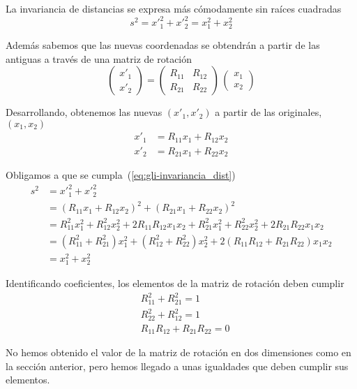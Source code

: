 La invariancia de distancias se expresa más cómodamente sin raíces cuadradas
\begin{equation}
  \label{eq:gli-invariancia_dist}
  s^2 = x'^2_1 + x'^2_2
  = x^2_1 + x^2_2
\end{equation}

Además sabemos que las nuevas coordenadas se obtendrán a partir de las antiguas a través de una matriz de rotación
\[
  \begin{pmatrix}
    x'_1 \\ x'_2
  \end{pmatrix}
  =
  \begin{pmatrix}
    R_{11} & R_{12}\\
    R_{21} & R_{22}
  \end{pmatrix}
  \,
  \begin{pmatrix}
    x_1 \\ x_2
  \end{pmatrix}
\]

Desarrollando, obtenemos las nuevas $(x'_1,x'_2)$ a partir de las originales, $(x_1,x_2)$
\begin{align*}
  x'_1 &= R_{11} x_1 + R_{12} x_2\\
  x'_2 &= R_{21} x_1 + R_{22} x_2
\end{align*}

Obligamos a que se cumpla~(\ref{eq:gli-invariancia_dist})
\begin{align*}
  s^2 &= x'^2_1 + x'^2_2\\
      &= (R_{11} x_1 + R_{12} x_2)^2 + (R_{21} x_1 + R_{22} x_2)^2\\
      &= R^2_{11} x^2_1 + R^2_{12} x^2_2 + 2 R_{11} R_{12} x_1 x_2
        + R^2_{21} x^2_1 + R^2_{22} x^2_2 + 2 R_{21} R_{22} x_1 x_2\\
      &= (R^2_{11} + R^2_{21}) x^2_1 + (R^2_{12} + R^2_{22}) x^2_2
        + 2 (R_{11} R_{12} + R_{21} R_{22}) x_1 x_2\\
      &= x^2_1 + x^2_2
\end{align*}

Identificando coeficientes, los elementos de la matriz de rotación deben cumplir
\begin{align*}
  &R^2_{11} + R^2_{21} = 1\\
  &R^2_{22} + R^2_{12} = 1\\
  & R_{11} R_{12} + R_{21} R_{22} = 0
\end{align*}

No hemos obtenido el valor de la matriz de rotación en dos dimensiones como en la sección anterior, pero hemos llegado a unas igualdades que deben cumplir sus elementos.


